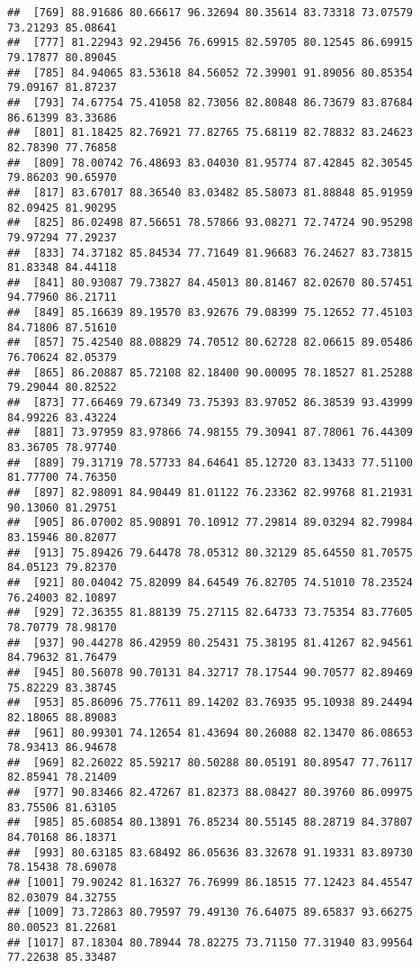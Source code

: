 \documentclass[
]{article}
\begin{document}
\begin{verbatim}
##  [769] 88.91686 80.66617 96.32694 80.35614 83.73318 73.07579 73.21293 85.08641
##  [777] 81.22943 92.29456 76.69915 82.59705 80.12545 86.69915 79.17877 80.89045
##  [785] 84.94065 83.53618 84.56052 72.39901 91.89056 80.85354 79.09167 81.87237
##  [793] 74.67754 75.41058 82.73056 82.80848 86.73679 83.87684 86.61399 83.33686
##  [801] 81.18425 82.76921 77.82765 75.68119 82.78832 83.24623 82.78390 77.76858
##  [809] 78.00742 76.48693 83.04030 81.95774 87.42845 82.30545 79.86203 90.65970
##  [817] 83.67017 88.36540 83.03482 85.58073 81.88848 85.91959 82.09425 81.90295
##  [825] 86.02498 87.56651 78.57866 93.08271 72.74724 90.95298 79.97294 77.29237
##  [833] 74.37182 85.84534 77.71649 81.96683 76.24627 83.73815 81.83348 84.44118
##  [841] 80.93087 79.73827 84.45013 80.81467 82.02670 80.57451 94.77960 86.21711
##  [849] 85.16639 89.19570 83.92676 79.08399 75.12652 77.45103 84.71806 87.51610
##  [857] 75.42540 88.08829 74.70512 80.62728 82.06615 89.05486 76.70624 82.05379
##  [865] 86.20887 85.72108 82.18400 90.00095 78.18527 81.25288 79.29044 80.82522
##  [873] 77.66469 79.67349 73.75393 83.97052 86.38539 93.43999 84.99226 83.43224
##  [881] 73.97959 83.97866 74.98155 79.30941 87.78061 76.44309 83.36705 78.97740
##  [889] 79.31719 78.57733 84.64641 85.12720 83.13433 77.51100 81.77700 74.76350
##  [897] 82.98091 84.90449 81.01122 76.23362 82.99768 81.21931 90.13060 81.29751
##  [905] 86.07002 85.90891 70.10912 77.29814 89.03294 82.79984 83.15946 80.82077
##  [913] 75.89426 79.64478 78.05312 80.32129 85.64550 81.70575 84.05123 79.82370
##  [921] 80.04042 75.82099 84.64549 76.82705 74.51010 78.23524 76.24003 82.10897
##  [929] 72.36355 81.88139 75.27115 82.64733 73.75354 83.77605 78.70779 78.98170
##  [937] 90.44278 86.42959 80.25431 75.38195 81.41267 82.94561 84.79632 81.76479
##  [945] 80.56078 90.70131 84.32717 78.17544 90.70577 82.89469 75.82229 83.38745
##  [953] 85.86096 75.77611 89.14202 83.76935 95.10938 89.24494 82.18065 88.89083
##  [961] 80.99301 74.12654 81.43694 80.26088 82.13470 86.08653 78.93413 86.94678
##  [969] 82.26022 85.59217 80.50288 80.05191 80.89547 77.76117 82.85941 78.21409
##  [977] 90.83466 82.47267 81.82373 88.08427 80.39760 86.09975 83.75506 81.63105
##  [985] 85.60854 80.13891 76.85234 80.55145 88.28719 84.37807 84.70168 86.18371
##  [993] 80.63185 83.68492 86.05636 83.32678 91.19331 83.89730 78.15438 78.69078
## [1001] 79.90242 81.16327 76.76999 86.18515 77.12423 84.45547 82.03079 84.32755
## [1009] 73.72863 80.79597 79.49130 76.64075 89.65837 93.66275 80.00523 81.22681
## [1017] 87.18304 80.78944 78.82275 73.71150 77.31940 83.99564 77.22638 85.33487

\end{verbatim}
\end{document}
